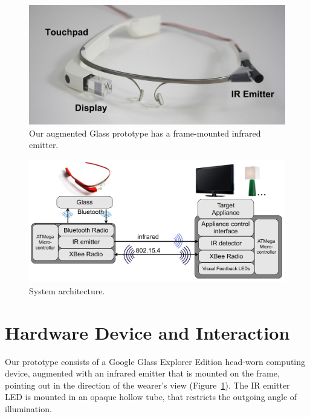 \begin{figure}[t]
\centering
\includegraphics[width=1.0\columnwidth]{figures/glass-with-ir}
\caption{Our augmented Glass prototype has a frame-mounted infrared emitter.}
\label{fig:glass}
\end{figure}
\begin{figure}[t]
\centering
\includegraphics[width=1.0\columnwidth]{figures/architecture}
\caption{System architecture.}
\label{fig:architecture}
\end{figure}

\section{Hardware Device and Interaction}

Our prototype consists of a Google Glass Explorer Edition head-worn computing device, augmented with an infrared emitter that is mounted on the frame, pointing out in the direction of the wearer's view (Figure~\ref{fig:glass}). The IR emitter LED is mounted in an opaque hollow tube, that restricts the outgoing angle of illumination. 

